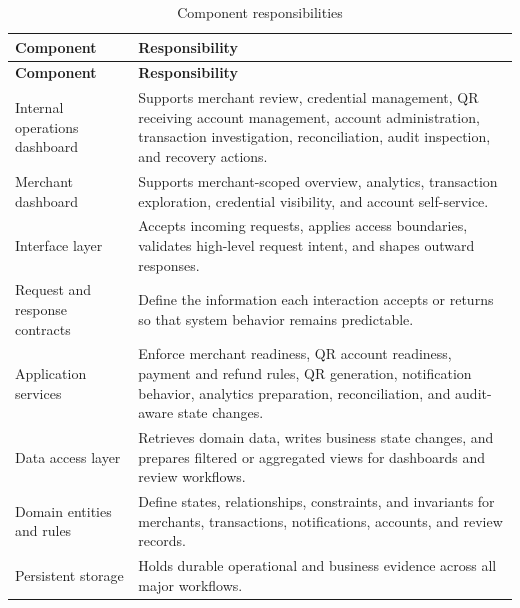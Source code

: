 \begin{longtable}{L{0.26\textwidth}L{0.64\textwidth}}
\caption{Component responsibilities}\\
\toprule
\textbf{Component} & \textbf{Responsibility} \\
\midrule
\endfirsthead
\toprule
\textbf{Component} & \textbf{Responsibility} \\
\midrule
\endhead
Internal operations dashboard & Supports merchant review, credential management, QR receiving account management, account administration, transaction investigation, reconciliation, audit inspection, and recovery actions. \\
\bodyrowrule
Merchant dashboard & Supports merchant-scoped overview, analytics, transaction exploration, credential visibility, and account self-service. \\
\bodyrowrule
Interface layer & Accepts incoming requests, applies access boundaries, validates high-level request intent, and shapes outward responses. \\
\bodyrowrule
Request and response contracts & Define the information each interaction accepts or returns so that system behavior remains predictable. \\
\bodyrowrule
Application services & Enforce merchant readiness, QR account readiness, payment and refund rules, QR generation, notification behavior, analytics preparation, reconciliation, and audit-aware state changes. \\
\bodyrowrule
Data access layer & Retrieves domain data, writes business state changes, and prepares filtered or aggregated views for dashboards and review workflows. \\
\bodyrowrule
Domain entities and rules & Define states, relationships, constraints, and invariants for merchants, transactions, notifications, accounts, and review records. \\
\bodyrowrule
Persistent storage & Holds durable operational and business evidence across all major workflows. \\
\bottomrule
\end{longtable}

